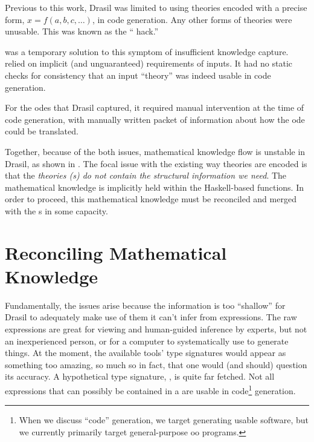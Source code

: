 Previous to this work, Drasil was limited to using theories encoded with a
precise form, \(x = f(a, b, c, \ldots{})\), in code generation. Any other forms
of theories were unusable. This was known as the ``\relToQD{} hack.''

\originalRelToQDHaskell{}

 was a temporary solution to this symptom of
insufficient knowledge capture. \relToQD{} relied on implicit (and unguaranteed)
requirements of inputs. It had no static checks for consistency that an input
``theory'' was indeed usable in code generation.

For the \acsp{ode} that Drasil captured, it required manual intervention at the
time of code generation, with manually written packet of information about how
the \acs{ode} could be translated.

Together, because of the both issues, mathematical knowledge flow is unstable in
Drasil, as shown in . The focal issue with the
existing way theories are encoded is that the \textit{theories
(\RelationConcept{}s) do not contain the structural information we need}. The
mathematical knowledge is implicitly held within the Haskell-based functions. In
order to proceed, this mathematical knowledge must be reconciled and merged with
the \RelationConcept{}s in some capacity.

\theoriesWithoutModelKinds{}

\section{Reconciling Mathematical Knowledge}

Fundamentally, the issues arise because the information is too ``shallow'' for
Drasil to adequately make use of them \textemdash{} it can't infer from
expressions. The raw expressions are great for viewing and human-guided
inference by experts, but not an inexperienced person, or for a computer to
systematically use to generate things. At the moment, the available tools' type
signatures would appear as something too amazing, so much so in fact, that one
would (and should) question its accuracy. A hypothetical type signature,
, is quite far fetched. Not all expressions
that can possibly be contained in a \RelationConcept{} are usable in
code\footnote{When we discuss ``code'' generation, we target generating usable
	software, but we currently primarily target general-purpose \acs{oo} programs.}
generation.

